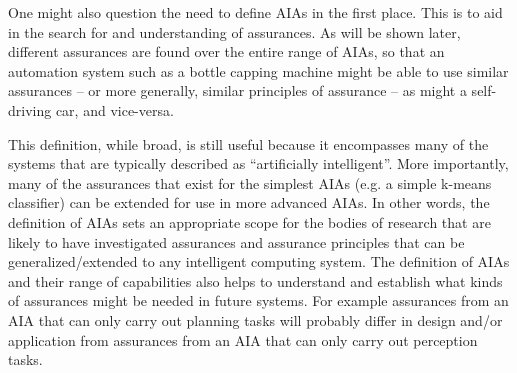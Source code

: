     One might also question the need to define AIAs in the first place. This is to aid in the search for and understanding of assurances. As will be shown later, different assurances are found over the entire range of AIAs, so that an automation system such as a bottle capping machine might be able to use similar assurances -- or more generally, similar principles of assurance -- as might a self-driving car, and vice-versa.

    This definition, while broad, is still useful because it encompasses many of the systems that are typically described as ``artificially intelligent''. More importantly, many of the assurances that exist for the simplest AIAs (e.g. a simple k-means classifier) can be extended for use in more advanced AIAs. In other words, the definition of AIAs sets an appropriate scope for the bodies of research that are likely to have investigated assurances and assurance principles that can be generalized/extended to any intelligent computing system. The definition of AIAs and their range of capabilities also helps to understand and establish what kinds of assurances might be needed in future systems. For example assurances from an AIA that can only carry out planning tasks will probably differ in design and/or application from assurances from an AIA that can only carry out perception tasks. 
